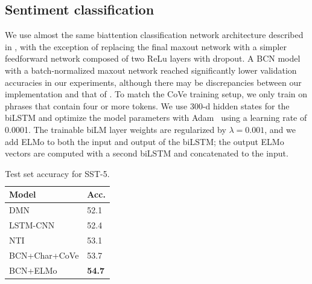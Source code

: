 \documentclass[11pt,a4paper]{article}
\newcommand{\ELMO}{ELMo}
\begin{document}
\subsection{Sentiment classification}
We use almost the same biattention classification network architecture described in \citet{McCann2017LearnedIT}, with the exception of replacing the final maxout network with a simpler feedforward network composed of two ReLu layers with dropout. A BCN model with a batch-normalized maxout network reached significantly lower validation accuracies in our experiments, although there may be discrepancies between our implementation and that of \citet{McCann2017LearnedIT}. To match the CoVe training setup, we only train on phrases that contain four or more tokens. We use 300-d hidden states for the biLSTM and optimize the model parameters with Adam~\cite{Kingma2014AdamAM} using a learning rate of 0.0001. The trainable biLM layer weights are regularized by $\lambda=0.001$, and we add ELMo to both the input and output of the biLSTM; the output ELMo vectors are computed with a second biLSTM and concatenated to the input. 

\begin{table}
\centering
\begin{tabular}{l|l}
\textbf{Model}                                & \textbf{Acc.} \\ \hline \hline
DMN \citep{kumar2015ask} & 52.1 \\
LSTM-CNN \citep{zhou2016text} & 52.4 \\
NTI \citep{munkhdalaineural} & 53.1 \\
BCN+Char+CoVe \citep{McCann2017LearnedIT} & 53.7 \\
BCN+\ELMO   & \textbf{54.7}
\end{tabular}
\caption{Test set accuracy for SST-5.
}
\label{table:sst_test}
\end{table}
\end{document}
